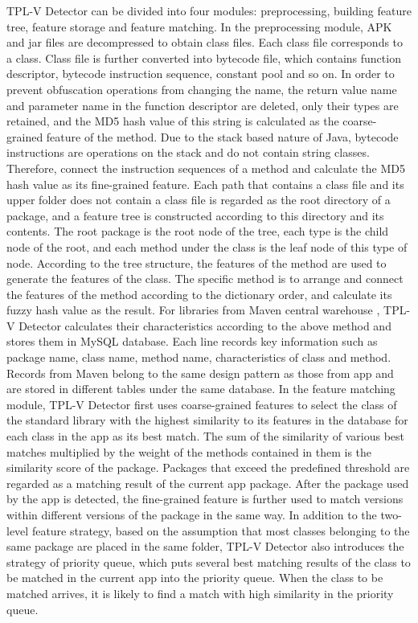 \begin{digest}
TPL-V Detector can be divided into four modules: preprocessing, building feature tree, feature storage and feature matching. In the preprocessing module, APK and jar files are decompressed to obtain class files. Each class file corresponds to a class. Class file is further converted into bytecode file, which contains function descriptor, bytecode instruction sequence, constant pool and so on. In order to prevent obfuscation operations from changing the name, the return value name and parameter name in the function descriptor are deleted, only their types are retained, and the MD5 hash value of this string is calculated as the coarse-grained feature of the method. Due to the stack based nature of Java, bytecode instructions are operations on the stack and do not contain string classes. Therefore, connect the instruction sequences of a method and calculate the MD5 hash value as its fine-grained feature. Each path that contains a class file and its upper folder does not contain a class file is regarded as the root directory of a package, and a feature tree is constructed according to this directory and its contents. The root package is the root node of the tree, each type is the child node of the root, and each method under the class is the leaf node of this type of node. According to the tree structure, the features of the method are used to generate the features of the class. The specific method is to arrange and connect the features of the method according to the dictionary order, and calculate its fuzzy hash value as the result. For libraries from Maven central warehouse \cite{maven}, TPL-V Detector calculates their characteristics according to the above method and stores them in MySQL database. Each line records key information such as package name, class name, method name, characteristics of class and method. Records from Maven belong to the same design pattern as those from app and are stored in different tables under the same database. In the feature matching module, TPL-V Detector first uses coarse-grained features to select the class of the standard library with the highest similarity to its features in the database for each class in the app as its best match. The sum of the similarity of various best matches multiplied by the weight of the methods contained in them is the similarity score of the package. Packages that exceed the predefined threshold are regarded as a matching result of the current app package. After the package used by the app is detected, the fine-grained feature is further used to match versions within different versions of the package in the same way. In addition to the two-level feature strategy, based on the assumption that most classes belonging to the same package are placed in the same folder, TPL-V Detector also introduces the strategy of priority queue, which puts several best matching results of the class to be matched in the current app into the priority queue. When the class to be matched arrives, it is likely to find a match with high similarity in the priority queue.




\end{digest}

